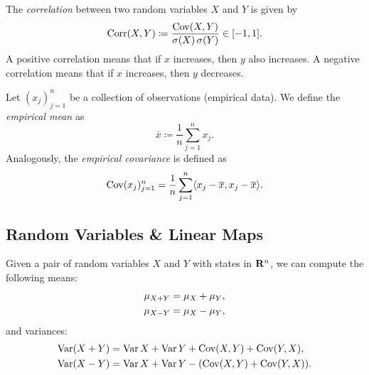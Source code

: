 \begin{definition}[Correlation]
\label{def:correlation}
The \emph{correlation} between two random variables \(X\) and \(Y\) is given by
\[
\operatorname{Corr}(X, Y) \coloneq \frac{\operatorname{Cov}(X, Y)}{\operatorname{\sigma}(X) \operatorname{\sigma}(Y)} \in [-1, 1].
\]
A positive correlation means that if \(x\) increases, then \(y\) also
increases. A negative correlation means that if \(x\) increases, then \(y\)
decreases.
\end{definition}

\begin{definition}
\label{def:empirical-mean-and-covariance}
Let \((x_j)_{j=1}^{n}\) be a collection of observations (empirical data). We
define the \emph{empirical mean} as
\[
\overline x \coloneq \frac{1}{n} \sum_{j=1}^n x_j.
\]
Analogously, the \emph{empirical covariance} is defined as
\[
\operatorname{Cov}(x_j)_{j=1}^n
= \frac{1}{n} \sum_{j=1}^n \langle x_j - \overline x, x_j - \overline x \rangle.
\]
\end{definition}

\subsection{Random Variables \& Linear Maps}

\begin{lemma}
\label{lem:sums-differences-random-variables}
Given a pair of random variables \(X\) and \(Y\) with states in \(\mathbf{R}^n\), we can
compute the following means:
\begin{align*}
  \mu_{X + Y} &= \mu_X + \mu_Y, \\
  \mu_{X - Y} &= \mu_X - \mu_Y,
\end{align*}
and variances:
\begin{align*}
  \operatorname{Var}(X + Y) &= \operatorname{Var} X + \operatorname{Var} Y + \operatorname{Cov}(X, Y) + \operatorname{Cov}(Y, X), \\
  \operatorname{Var}(X - Y) &= \operatorname{Var} X + \operatorname{Var} Y - (\operatorname{Cov}(X, Y) + \operatorname{Cov}(Y, X)). \\
\end{align*}
\end{lemma}

